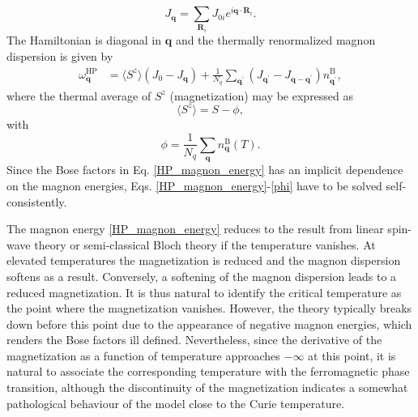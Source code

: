 \documentclass[aps,prb,reprint,floatfix,superscriptaddress]{revtex4-2}
\begin{document}
\begin{equation}
    J_{\mathbf{q}} = \sum_{\mathbf{R}_i} J_{0i} e^{i{\mathbf{q}} \cdot \mathbf{R}_i} \label{Jij-q-space}.
\end{equation}
The Hamiltonian is diagonal in $\mathbf{q}$ and the thermally renormalized magnon dispersion is given by \cite{Yosida1996}
\begin{align}\label{HP_magnon_energy}
    \omega_{\mathbf{q}}^\mathrm{HP} &=  \langle S^z \rangle (J_0 - J_{\mathbf{q}})+ \frac{1}{N_q}\sum_{\mathbf{q}^\prime}(J_{{\mathbf{q}}^\prime} - J_{\mathbf{q} - {\mathbf{q}}^\prime})n^\mathrm{B}_{{\mathbf{q}}^\prime},
\end{align}
where the thermal average of $S^z$ (magnetization) may be expressed as
\begin{equation}\label{HP_mag}
    \langle S^z \rangle = S - \phi,
\end{equation}
with
\begin{equation}\label{phi}
    \phi = \frac{1}{N_q} \sum_{\mathbf{q}} n^\mathrm{B}_{\mathbf{q}}(T).
\end{equation}
Since the Bose factors in Eq. \eqref{HP_magnon_energy} has an implicit dependence on the magnon energies, Eqs. \eqref{HP_magnon_energy}-\eqref{phi} have to be solved self-consistently.

The magnon energy \eqref{HP_magnon_energy} reduces to the result from linear spin-wave theory or semi-classical Bloch theory if the temperature vanishes. At elevated temperatures the magnetization is reduced and the magnon dispersion softens as a result. Conversely, a softening of the magnon dispersion leads to a reduced magnetization. It is thus natural to identify the critical temperature as the point where the magnetization vanishes. However, the theory typically breaks down before this point due to the appearance of negative magnon energies, which renders the Bose factors ill defined. Nevertheless, since the derivative of the magnetization as a function of temperature approaches $-\infty$ at this point, it is natural to associate the corresponding temperature with the ferromagnetic phase transition, although the discontinuity of the magnetization indicates a somewhat pathological behaviour of the model close to the Curie temperature.
\end{document}
